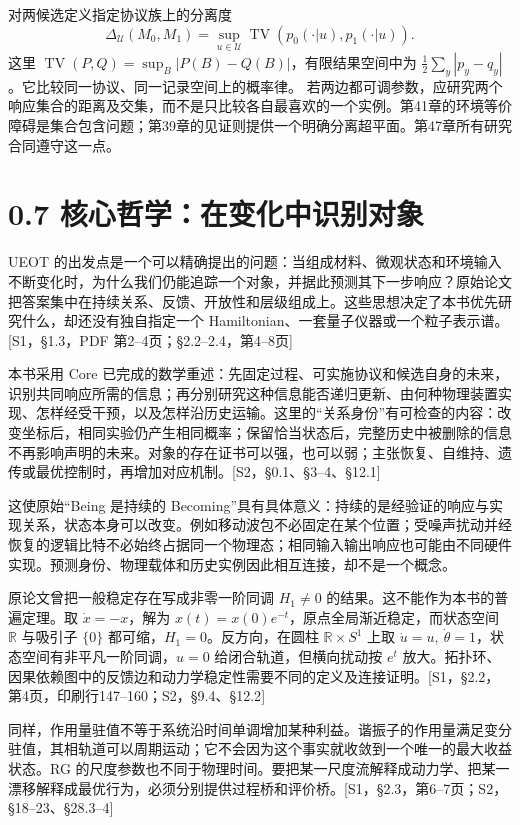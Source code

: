 \documentclass[
  11pt,
  oneside]{book}
\begin{document}
对两候选定义指定协议族上的分离度 \[
\Delta_{\mathcal U}(M_0,M_1)
=\sup_{u\in\mathcal U}\operatorname{TV}(p_0(\cdot|u),p_1(\cdot|u)).
\] 这里 \(\operatorname{TV}(P,Q)=\sup_B|P(B)-Q(B)|\)，有限结果空间中为
\(\tfrac12\sum_y|p_y-q_y|\)。它比较同一协议、同一记录空间上的概率律。
若两边都可调参数，应研究两个响应集合的距离及交集，而不是只比较各自最喜欢的一个实例。第41章的环境等价障碍是集合包含问题；第39章的见证则提供一个明确分离超平面。第47章所有研究合同遵守这一点。

\hypertarget{ux6838ux5fc3ux54f2ux5b66ux5728ux53d8ux5316ux4e2dux8bc6ux522bux5bf9ux8c61}{%
\section{0.7
核心哲学：在变化中识别对象}\label{ux6838ux5fc3ux54f2ux5b66ux5728ux53d8ux5316ux4e2dux8bc6ux522bux5bf9ux8c61}}

UEOT
的出发点是一个可以精确提出的问题：当组成材料、微观状态和环境输入不断变化时，为什么我们仍能追踪一个对象，并据此预测其下一步响应？原始论文把答案集中在持续关系、反馈、开放性和层级组成上。这些思想决定了本书优先研究什么，却还没有独自指定一个
Hamiltonian、一套量子仪器或一个粒子表示谱。{[}S1，§1.3，PDF
第2--4页；§2.2--2.4，第4--8页{]}

本书采用 Core
已完成的数学重述：先固定过程、可实施协议和候选自身的未来，识别共同响应所需的信息；再分别研究这种信息能否递归更新、由何种物理装置实现、怎样经受干预，以及怎样沿历史运输。这里的``关系身份''有可检查的内容：改变坐标后，相同实验仍产生相同概率；保留恰当状态后，完整历史中被删除的信息不再影响声明的未来。对象的存在证书可以强，也可以弱；主张恢复、自维持、遗传或最优控制时，再增加对应机制。{[}S2，§0.1、§3--4、§12.1{]}

这使原始``Being 是持续的
Becoming''具有具体意义：持续的是经验证的响应与实现关系，状态本身可以改变。例如移动波包不必固定在某个位置；受噪声扰动并经恢复的逻辑比特不必始终占据同一个物理态；相同输入输出响应也可能由不同硬件实现。预测身份、物理载体和历史实例因此相互连接，却不是一个概念。

原论文曾把一般稳定存在写成非零一阶同调 \(H_1\ne0\)
的结果。这不能作为本书的普遍定理。取 \(\dot x=-x\)，解为
\(x(t)=x(0)e^{-t}\)，原点全局渐近稳定，而状态空间 \(\mathbb R\) 与吸引子
\(\{0\}\) 都可缩，\(H_1=0\)。反方向，在圆柱 \(\mathbb R\times S^1\) 上取
\(\dot u=u,\ \dot\theta=1\)，状态空间有非平凡一阶同调，\(u=0\)
给闭合轨道，但横向扰动按 \(e^t\)
放大。拓扑环、因果依赖图中的反馈边和动力学稳定性需要不同的定义及连接证明。{[}S1，§2.2，第4页，印刷行147--160；S2，§9.4、§12.2{]}

同样，作用量驻值不等于系统沿时间单调增加某种利益。谐振子的作用量满足变分驻值，其相轨道可以周期运动；它不会因为这个事实就收敛到一个唯一的最大收益状态。RG
的尺度参数也不同于物理时间。要把某一尺度流解释成动力学、把某一漂移解释成最优行为，必须分别提供过程桥和评价桥。{[}S1，§2.3，第6--7页；S2，§18--23、§28.3--4{]}
\end{document}
